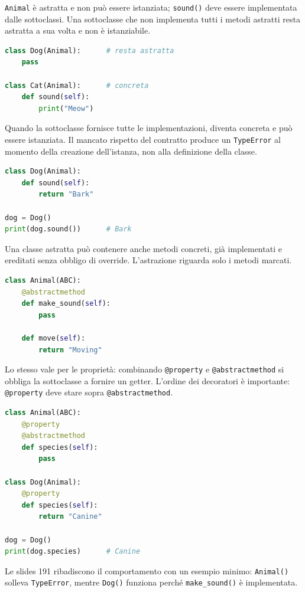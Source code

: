 \documentclass[12pt]{extarticle}
\begin{document}
\noindent \texttt{Animal} è astratta e non può essere istanziata; \texttt{sound()} deve essere implementata dalle sottoclassi. Una sottoclasse che non implementa tutti i metodi astratti resta astratta a sua volta e non è istanziabile.

\begin{lstlisting}[language=Python]
class Dog(Animal):      # resta astratta
    pass

class Cat(Animal):      # concreta
    def sound(self):
        print("Meow")
\end{lstlisting}

\noindent Quando la sottoclasse fornisce tutte le implementazioni, diventa concreta e può essere istanziata. Il mancato rispetto del contratto produce un \texttt{TypeError} al momento della creazione dell'istanza, non alla definizione della classe.

\begin{lstlisting}[language=Python]
class Dog(Animal):
    def sound(self):
        return "Bark"

dog = Dog()
print(dog.sound())      # Bark
\end{lstlisting}

\noindent Una classe astratta può contenere anche metodi concreti, già implementati e ereditati senza obbligo di override. L'astrazione riguarda solo i metodi marcati.

\begin{lstlisting}[language=Python]
class Animal(ABC):
    @abstractmethod
    def make_sound(self):
        pass

    def move(self):
        return "Moving"
\end{lstlisting}

\noindent Lo stesso vale per le proprietà: combinando \texttt{@property} e \texttt{@abstractmethod} si obbliga la sottoclasse a fornire un getter. L'ordine dei decoratori è importante: \texttt{@property} deve stare sopra \texttt{@abstractmethod}.

\begin{lstlisting}[language=Python]
class Animal(ABC):
    @property
    @abstractmethod
    def species(self):
        pass

class Dog(Animal):
    @property
    def species(self):
        return "Canine"

dog = Dog()
print(dog.species)      # Canine
\end{lstlisting}

\noindent Le slides 191 ribadiscono il comportamento con un esempio minimo: \texttt{Animal()} solleva \texttt{TypeError}, mentre \texttt{Dog()} funziona perché \texttt{make\_sound()} è implementata.
\end{document}
